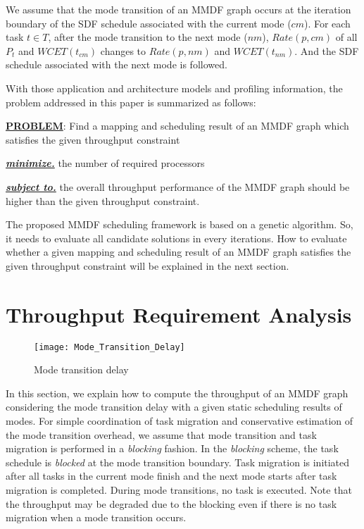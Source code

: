 \documentclass[prodmode,acmtecs]{acmsmall}
\begin{document}
We assume that the mode transition of an MMDF graph occurs at the iteration boundary of the SDF schedule associated with the current mode ($cm$). For each task $t \in T$, after the mode transition to the next mode ($nm$), $Rate(p,cm)$ of all $P_t$ and $WCET(t_{cm})$ changes to $Rate(p,nm)$ and $WCET(t_{nm})$. And the SDF schedule associated with the next mode is followed.

With those application and architecture models and profiling information, the problem addressed in this paper is summarized as follows:

\vspace{0.3cm}

\textbf{\underline{PROBLEM}}: Find a mapping and scheduling result of an MMDF graph which satisfies the given throughput constraint

\vspace{0.2cm}

\textbf{\textit{\underline{minimize.}}} the number of required processors

\vspace{0.2cm}

\textbf{\textit{\underline{subject to.}}} the overall throughput performance of the MMDF graph should be higher than the given throughput constraint.

\vspace{0.3cm}

The proposed MMDF scheduling framework is based on a genetic algorithm. So, it needs to evaluate all candidate solutions in every iterations. How to evaluate whether a given mapping and scheduling result of an MMDF graph satisfies the given throughput constraint will be explained in the next section.

\section{Throughput Requirement Analysis}
\label{Section:Throughput Requirement Analysis}

\begin{figure} [ht]
\centerline{\texttt{[image: Mode\_Transition\_Delay]}}
\caption{Mode transition delay}
\label{Figure:Mode Transition Delay}
\end{figure}

In this section, we explain how to compute the throughput of an MMDF graph considering the mode transition delay with a given static scheduling results of modes. For simple coordination of task migration and conservative estimation of the mode transition overhead, we assume that mode transition and task migration is performed in a \textit{blocking} fashion. In the \textit{blocking} scheme, the task schedule is \textit{blocked} at the mode transition boundary. Task migration is initiated after all tasks in the current mode finish and the next mode starts after task migration is completed. During mode transitions, no task is executed. Note that the throughput may be degraded due to the blocking even if there is no task migration when a mode transition occurs.
\end{document}
